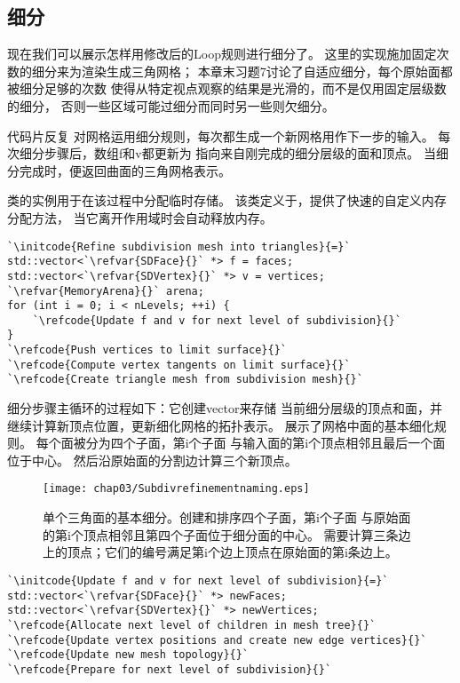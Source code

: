 \subsection{细分}\label{sub:细分}
现在我们可以展示怎样用修改后的Loop规则进行细分了。
这里的实现施加固定次数的细分来为渲染生成三角网格；
本章末习题7讨论了自适应细分，每个原始面都被细分足够的次数
使得从特定视点观察的结果是光滑的，而不是仅用固定层级数的细分，
否则一些区域可能过细分而同时另一些则欠细分。

代码片反复
对网格运用细分规则，每次都生成一个新网格用作下一步的输入。
每次细分步骤后，数组{\ttfamily f}和{\ttfamily v}都更新为
指向来自刚完成的细分层级的面和顶点。
当细分完成时，便返回曲面的三角网格表示。

类的实例用于在该过程中分配临时存储。
该类定义于，提供了快速的自定义内存分配方法，
当它离开作用域时会自动释放内存。

\begin{lstlisting}
`\initcode{Refine subdivision mesh into triangles}{=}`
std::vector<`\refvar{SDFace}{}` *> f = faces;
std::vector<`\refvar{SDVertex}{}` *> v = vertices;
`\refvar{MemoryArena}{}` arena;
for (int i = 0; i < nLevels; ++i) {
    `\refcode{Update f and v for next level of subdivision}{}`
}
`\refcode{Push vertices to limit surface}{}`
`\refcode{Compute vertex tangents on limit surface}{}`
`\refcode{Create triangle mesh from subdivision mesh}{}`
\end{lstlisting}

细分步骤主循环的过程如下：它创建{\ttfamily vector}来存储
当前细分层级的顶点和面，并继续计算新顶点位置，更新细化网格的拓扑表示。
展示了网格中面的基本细化规则。
每个面被分为四个子面，第{\ttfamily i}个子面
与输入面的第{\ttfamily i}个顶点相邻且最后一个面位于中心。
然后沿原始面的分割边计算三个新顶点。
\begin{figure}[htbp]
    \centering\texttt{[image: chap03/Subdivrefinementnaming.eps]}
    \caption{单个三角面的基本细分。创建和排序四个子面，第{\ttfamily i}个子面
    与原始面的第{\ttfamily i}个顶点相邻且第四个子面位于细分面的中心。
    需要计算三条边上的顶点；它们的编号满足第{\ttfamily i}个边上顶点在原始面的第{\ttfamily i}条边上。}
    \label{fig:3.32}
\end{figure}

\begin{lstlisting}
`\initcode{Update f and v for next level of subdivision}{=}`
std::vector<`\refvar{SDFace}{}` *> newFaces;
std::vector<`\refvar{SDVertex}{}` *> newVertices;
`\refcode{Allocate next level of children in mesh tree}{}`
`\refcode{Update vertex positions and create new edge vertices}{}`
`\refcode{Update new mesh topology}{}`
`\refcode{Prepare for next level of subdivision}{}`
\end{lstlisting}

